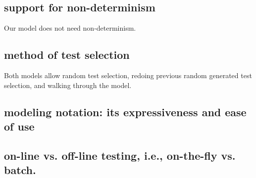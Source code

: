 \documentclass[11pt,a4paper]{article}
\begin{document}
\subsection{support for non-determinism}
Our model does not need non-determinism.

\subsection{method of test selection}
Both models allow random test selection, redoing previous random generated test selection, and walking through the model.
\subsection{modeling notation: its expressiveness and ease of use}

\subsection{on-line vs. off-line testing, i.e., on-the-fly vs. batch.}

\end{document}
